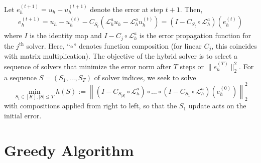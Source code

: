 \documentclass{article} %
\begin{document}
Let $e^{(t + 1)}_h = u_h - u^{\left(t + 1\right)}_h$ denote the error at step $t + 1$. Then, 
\begin{align*}
    e^{(t + 1)}_h = u_h -  u^{\left(t\right)}_h -C_{S_t}\left(\mathcal{L}_h^au_h - \mathcal{L}_h^au^{\left(t\right)}_h\right) = \left(I- C_{S_t} \circ \mathcal{L}_h^a\right)(e^{(t)}_h)
\end{align*}
where $I$ is the identity map and $I - C_{j} \circ\mathcal{L}_h^a$ is the error propagation function for the $j^{\text{th}}$ solver. Here, ``$\circ$'' denotes function composition (for linear $C_{j}$, this coincides with matrix multiplication).
The objective of the hybrid solver is to select a sequence of solvers that minimize the error norm after $T$ steps or $\|e^{(T)}_h\|_2^2$. For a sequence $S = (S_1, \dots, S_T)$ of solver indices,  we seek to solve 
\begin{equation} \label{eq:errorobjective}
    \min_{S_t \in [K], |S| \leq T} h(S) := \left\|\left(I - C_{S_{|S|}} \circ \mathcal{L}_h^a\right) \circ \dots \circ \left(I - C_{S_1} \circ \mathcal{L}_h^a\right)  \left(e^{(0)}_h \right)\right\|^2_2
\end{equation}
with compositions applied from right to left, so that the $S_1$ update acts on the initial error.



\section{Greedy Algorithm} \label{sec:greedy}
\end{document}
